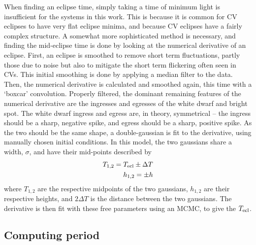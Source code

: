When finding an eclipse time, simply taking a time of minimum light is insufficient for the systems in this work. This is because it is common for CV eclipses to have very flat eclipse minima, and because CV eclipses have a fairly complex structure.
A somewhat more sophisticated method is necessary, and finding the mid-eclipse time is done by looking at the numerical derivative of an eclipse.
First, an eclipse is smoothed to remove short term fluctuations, partly those due to noise but also to mitigate the short term flickering often seen in CVs. This initial smoothing is done by applying a median filter to the data. Then, the numerical derivative is calculated and smoothed again, this time with a `boxcar' convolution. Properly filtered, the dominant remaining features of the numerical derivative are the ingresses and egresses of the white dwarf and bright spot.
The white dwarf ingress and egress are, in theory, symmetrical -- the ingress should be a sharp, negative spike, and egress should be a sharp, positive spike. As the two should be the same shape, a double-gaussian is fit to the derivative, using manually chosen initial conditions. In this model, the two gaussians share a width, $\sigma$, and have their mid-points described by
\begin{align*}
    T_{\rm 1,2} = T_{\rm ecl} \pm \Delta T \\
    h_{\rm 1,2} = \pm h
\end{align*}
where $T_{1,2}$ are the respective midpoints of the two gaussians, $h_{1,2}$ are their respective heights, and $2\Delta T$ is the distance between the two gaussians.
The derivative is then fit with these free parameters using an MCMC, to give the $T_{\rm ecl}$.

\subsection{Computing period}\label{sect:modelling:Computing ephemeris}


